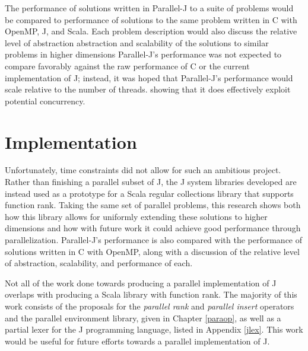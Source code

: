 The performance of solutions written in Parallel-J to a suite of problems would be compared to
performance of solutions to the same problem written in C with OpenMP, J, and Scala.
Each problem description would also discuss the relative level of abstraction abstraction and scalability 
of the solutions to similar problems in higher dimensions
Parallel-J's performance was not expected to compare favorably against the raw performance of C or the current implementation of J; 
instead, it was hoped that Parallel-J's performance would scale relative to the number of threads.
showing that it does effectively exploit potential concurrency.

\section{Implementation}
\label{imp}
Unfortunately, time constraints did not allow for such an ambitious project.
Rather than finishing a parallel subset of J, the J system libraries developed 
are instead used as a prototype for a Scala regular collections library that supports function rank.
Taking the same set of parallel problems, 
this research shows both how this library allows for uniformly extending these solutions to higher dimensions and 
how with future work it could achieve good performance through parallelization.
Parallel-J's performance is also compared with the performance of solutions written in C with OpenMP, 
along with a discussion of the relative level of abstraction, scalability, and performance of each.

Not all of the work done towards producing a parallel implementation of J 
overlaps with producing a Scala library with function rank. 
The majority of this work consists of the proposals 
for the \textit{parallel rank} and \textit{parallel insert} operators and the parallel environment library, 
given in Chapter \ref{paraop}, 
as well as a partial lexer for the J programming language, listed in Appendix \ref{jlex}. 
This work would be useful for future efforts towards a parallel implementation of J.
